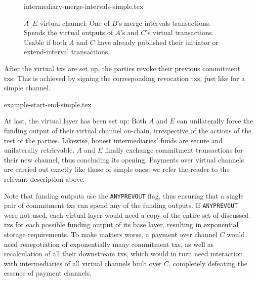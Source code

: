   \addtolength{\intextsep}{-15pt}
  \begin{figure}[!htbp]
    {intermediary-merge-intervals-simple.tex}
    \caption{$A$--$E$ virtual channel: One of $B$'s merge intervals
    transactions. Spends the virtual outputs of $A$'s and $C$'s virtual
    transactions. Usable if both $A$ and $C$ have already published their
    initiator or extend-interval transactions.}
    \label{figure:virtual-layer-merge-intervals-simple}
  \end{figure}
  \addtolength{\intextsep}{15pt}

  After the virtual txs are set up, the parties revoke their previous commitment
  txs. This is achieved by signing the corresponding revocation txs, just like
  for a simple channel.

  \addtolength{\intextsep}{-15pt}
  \begin{figure*}
    \centering
    {example-start-end-simple.tex}
    \caption{$4$ simple channels supporting a virtual. $A$ starts closing by
    publishing its initiator tx, then $B$--$D$ publish their
    suitable extend-interval. No party stays inactive.
    Virtual outputs are marked with the interval of parties that have
    already published a tx. \emph{Bridge} txs
    like $b$ convert the various virtual outputs into the
    same funding output, as \texttt{ANYPREVOUT} only works across identical
    outputs.}
    \label{figure:example-start-end-simple}
  \end{figure*}
  \addtolength{\intextsep}{15pt}

  At last, the virtual layer has been set up: Both $A$ and $E$ can unilaterally
  force the funding output of their virtual channel on-chain, irrespective of
  the actions of the rest of the parties. Likewise, honest intermediaries' funds
  are secure and unilaterally retrievable. $A$ and $E$ finally exchange
  commitment transactions for their new channel, thus concluding its opening.
  Payments over virtual channels are carried out exactly like those of simple
  ones; we refer the reader to the relevant description above.

  Note that funding outputs use the \texttt{ANYPREVOUT} flag, thus ensuring
  that a single pair of commitment txs can spend any of the funding outputs. If
  \texttt{ANYPREVOUT} were not used, each virtual layer would need a copy of the
  entire set of discussed txs for each possible funding output of its base
  layer, resulting in exponential storage requirements. To make matters worse,
  a payment over channel $C$ would need renegotiation of exponentially many
  commitment txs, as well as recalculation of all their downstream txs, which
  would in turn need interaction with intermediaries of all virtual channels
  built over $C$, completely defeating the essence of payment channels.

